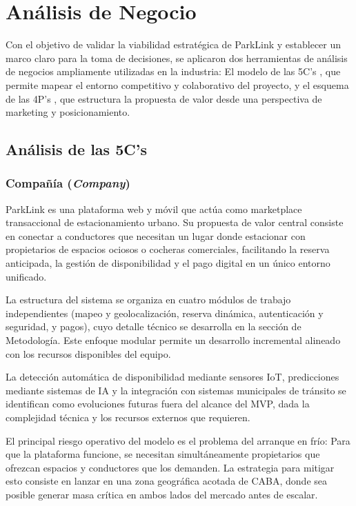 \section{Análisis de Negocio}\label{sec:negocio}

Con el objetivo de validar la viabilidad estratégica de ParkLink y establecer un marco claro para la toma de decisiones, se aplicaron dos herramientas de análisis de negocios ampliamente utilizadas en la industria: El modelo de las 5C's \autocite{catedra_5cs}, que permite mapear el entorno competitivo y colaborativo del proyecto, y el esquema de las 4P's \autocite{catedra_4ps}, que estructura la propuesta de valor desde una perspectiva de marketing y posicionamiento.

\subsection{Análisis de las 5C's}

\subsubsection{Compañía (\textit{Company})}

ParkLink es una plataforma web y móvil que actúa como marketplace transaccional de estacionamiento urbano. Su propuesta de valor central consiste en conectar a conductores que necesitan un lugar donde estacionar con propietarios de espacios ociosos o cocheras comerciales, facilitando la reserva anticipada, la gestión de disponibilidad y el pago digital en un único entorno unificado.

La estructura del sistema se organiza en cuatro módulos de trabajo independientes (mapeo y geolocalización, reserva dinámica, autenticación y seguridad, y pagos), cuyo detalle técnico se desarrolla en la sección de Metodología. Este enfoque modular permite un desarrollo incremental alineado con los recursos disponibles del equipo.

La detección automática de disponibilidad mediante sensores IoT, predicciones mediante sistemas de IA y la integración con sistemas municipales de tránsito se identifican como evoluciones futuras fuera del alcance del MVP, dada la complejidad técnica y los recursos externos que requieren.

El principal riesgo operativo del modelo es el problema del arranque en frío: Para que la plataforma funcione, se necesitan simultáneamente propietarios que ofrezcan espacios y conductores que los demanden. La estrategia para mitigar esto consiste en lanzar en una zona geográfica acotada de CABA, donde sea posible generar masa crítica en ambos lados del mercado antes de escalar.

